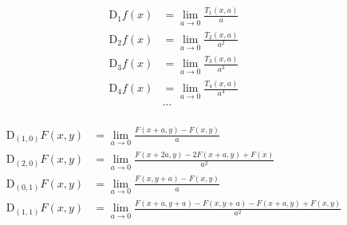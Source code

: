 \begin{equation*}
\begin{aligned}
\mathrm{D}_1 f(x) &= \lim_{a \to 0} \frac{T_1(x,a)}{a} \\
%
\mathrm{D}_2 f(x) &= \lim_{a \to 0} \frac{T_2(x,a)}{a^2} \\
%
\mathrm{D}_3 f(x) &= \lim_{a \to 0} \frac{T_3(x,a)}{a^3} \\
%
\mathrm{D}_4 f(x) &= \lim_{a \to 0} \frac{T_4(x,a)}{a^4} \\
%
&\ldots \\
\end{aligned}
\end{equation*}

\begin{equation*}
\begin{aligned}
\mathrm{D}_{(1,0)} F(x, y) &=
\lim_{a \to 0}{\frac{
  F(x + a, y)
- F(x, y)
}{a}}
\\
\mathrm{D}_{(2,0)} F(x, y) &=
\lim_{a \to 0}{\frac{
  F(x + 2 a, y)
- 2 F(x + a, y)
+ F(x)
}{a^2}}
\\
\mathrm{D}_{(0,1)} F(x, y) &=
\lim_{a \to 0}{\frac{
  F(x, y + a)
- F(x, y)
}{a}}
\\
\mathrm{D}_{(1,1)} F(x, y) &=
\lim_{a \to 0}{\frac{{
  F(x + a, y + a)
- F(x, y + a)
- F(x + a, y)
+ F(x, y)
}}{a^2}}
\\
\end{aligned}
\end{equation*}
